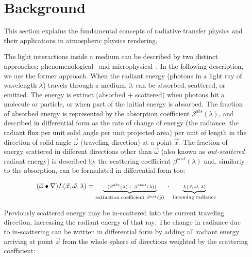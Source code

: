 \documentclass[journal]{vgtc}                %
\begin{document}



\section{Background}\label{sec:background}

This section explains the fundamental concepts of radiative transfer physics and their applications in atmospheric physics rendering.

The light interactions inside a medium can be described by two distinct approaches: phenomenological~\cite{Chandrasekhar:1960, Preisendorfer:1965} and microphysical~\cite{Mishchenko:article:2006}. In the following description, we use the former approach. When the radiant energy (photons in a light ray of wavelength $\lambda$) travels through a medium, it can be absorbed, scattered, or emitted. The energy is extinct (absorbed + scattered) when photons hit a molecule or particle, or when part of the initial energy is absorbed. The fraction of absorbed energy is represented by the absorption coefficient $\beta^{abs}(\lambda)$, and described in differential form as the rate of change of energy (the radiance: the radiant flux per unit solid angle per unit projected area) per unit of length in the direction of solid angle $\vec{\omega}$ (traveling direction) at a point $\vec{x}$. The fraction of energy scattered in different directions other than $\vec{\omega}$ (also known as \textit{out-scattered} radiant energy) is described by the scattering coefficient $\beta^{scat}(\lambda)$ and, similarly to the absorption, can be formulated in differential form too:

\vspace*{-1.5mm}
\begin{equation}\label{eq:extinction}
\small
(\vec{\omega}\bullet \nabla)L(\vec{x},\vec{\omega}, \lambda) = 
	\underbrace{-(\beta^{abs}(\lambda) + \beta^{scat}(\lambda))}_{\text{extinction coefficient }\beta^{ext}(\vec{y})} 
	\,\, \cdot \,\, \underbrace{L(\vec{x},\vec{\omega}, \lambda)}_{\text{incoming radiance}}
\end{equation}

Previously scattered energy may be in-scattered into the current traveling direction, increasing the radiant energy of that ray.  The change in radiance due to in-scattering can be written in differential form by adding all radiant energy arriving at point $\vec{x}$ from the whole sphere of directions weighted by the scattering coefficient:
\end{document}
